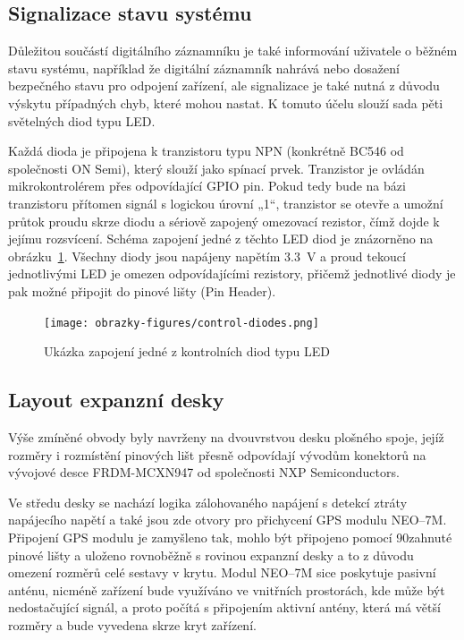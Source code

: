 \newpage

\subsection{Signalizace stavu systému}
Důležitou součástí digitálního záznamníku je také informování uživatele o běžném stavu systému, například že digitální záznamník nahrává nebo dosažení bezpečného stavu pro odpojení zařízení, ale signalizace je také nutná z důvodu výskytu případných chyb, které mohou nastat. K tomuto účelu slouží sada pěti světelných diod typu LED.

Každá dioda je připojena k tranzistoru typu NPN (konkrétně BC546 od společnosti ON Semi), který slouží jako spínací prvek. Tranzistor je ovládán mikrokontrolérem přes odpovídající GPIO pin. Pokud tedy bude na bázi tranzistoru přítomen signál s logickou úrovní „1“, tranzistor se otevře a umožní průtok proudu skrze diodu a sériově zapojený omezovací rezistor, čímž dojde k jejímu rozsvícení. Schéma zapojení jedné z těchto LED diod je znázorněno na obrázku~\ref{fig:control-diodes}. Všechny diody jsou napájeny napětím \SI{3.3}{\volt} a proud tekoucí jednotlivými LED je omezen odpovídajícími rezistory, přičemž jednotlivé diody je pak možné připojit do pinové lišty (Pin Header).

\begin{figure}[h]
    \centering
    \texttt{[image: obrazky-figures/control-diodes.png]}
    
    \caption{Ukázka zapojení jedné z kontrolních diod typu LED}
    \label{fig:control-diodes}
\end{figure}

\newpage

\subsection{Layout expanzní desky}
\label{bom_list}
Výše zmíněné obvody byly navrženy na dvouvrstvou desku plošného spoje, jejíž rozměry i rozmístění pinových lišt přesně odpovídají vývodům konektorů na vývojové desce FRDM-MCXN947 od společnosti NXP Semiconductors.

Ve středu desky se nachází logika zálohovaného napájení s detekcí ztráty napájecího napětí a také jsou zde otvory pro přichycení GPS modulu NEO--7M. Připojení GPS modulu je zamyšleno tak, mohlo být připojeno pomocí 90\textdegree zahnuté pinové lišty a uloženo rovnoběžně s rovinou expanzní desky a to z důvodu omezení rozměrů celé sestavy v krytu. Modul NEO--7M sice poskytuje pasivní anténu, nicméně zařízení bude využíváno ve vnitřních prostorách, kde může být nedostačující signál, a proto počítá s připojením aktivní antény, která má větší rozměry a bude vyvedena skrze kryt zařízení. 

